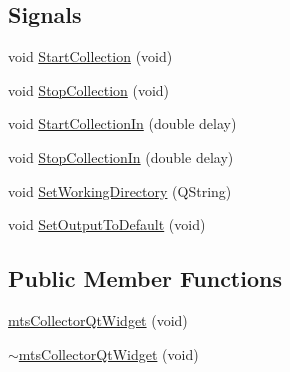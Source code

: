 \subsection*{Signals}
\begin{DoxyCompactItemize}
\item 
void \hyperlink{classmts_collector_qt_widget_a0d2f433d3246d55d80d6f35eae3799e2}{Start\-Collection} (void)
\item 
void \hyperlink{classmts_collector_qt_widget_a08ea3c401e89cc9c65f31611c3cb1b0e}{Stop\-Collection} (void)
\item 
void \hyperlink{classmts_collector_qt_widget_a4a4e7713cddf98ffc22466c9cc57d1d9}{Start\-Collection\-In} (double delay)
\item 
void \hyperlink{classmts_collector_qt_widget_add7cedb03020f4277f05996515584098}{Stop\-Collection\-In} (double delay)
\item 
void \hyperlink{classmts_collector_qt_widget_a451a4f753a956d81690518c67ed55cea}{Set\-Working\-Directory} (Q\-String)
\item 
void \hyperlink{classmts_collector_qt_widget_a381c583eb8f2acae4a7f5426cba3dd60}{Set\-Output\-To\-Default} (void)
\end{DoxyCompactItemize}
\subsection*{Public Member Functions}
\begin{DoxyCompactItemize}
\item 
\hyperlink{classmts_collector_qt_widget_a9870d591db178a3879b23f465f455307}{mts\-Collector\-Qt\-Widget} (void)
\item 
\hyperlink{classmts_collector_qt_widget_a6e1e3427d752590a08cd1e02a321a380}{$\sim$mts\-Collector\-Qt\-Widget} (void)
\end{DoxyCompactItemize}
